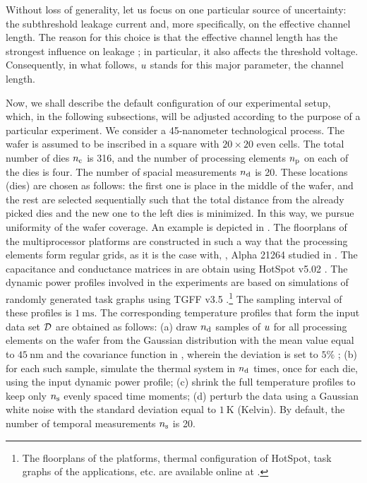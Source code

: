 Without loss of generality, let us focus on one particular source of uncertainty: the subthreshold leakage current and, more specifically, on the effective channel length. The reason for this choice is that the effective channel length has the strongest influence on leakage \cite{juan2011, juan2012}; in particular, it also affects the threshold voltage. Consequently, in what follows, $u$ stands for this major parameter, the channel length.



Now, we shall describe the default configuration of our experimental setup, which, in the following subsections, will be adjusted according to the purpose of a particular experiment. We consider a 45-nanometer technological process. The wafer is assumed to be inscribed in a square with $20 \times 20$ even cells. The total number of dies ${n_{\text{c}}}$ is 316, and the number of processing elements ${n_\text{p}}$ on each of the dies is four. The number of spacial measurements ${n_{\text{d}}}$ is 20. These locations (dies) are chosen as follows: the first one is place in the middle of the wafer, and the rest are selected sequentially such that the total distance from the already picked dies and the new one to the left dies is minimized. In this way, we pursue uniformity of the wafer coverage. An example is depicted in . The floorplans of the multiprocessor platforms are constructed in such a way that the processing elements form regular grids, as it is the case with, \eg, Alpha 21264 studied in \cite{juan2011}. The capacitance and conductance matrices in  are obtain using HotSpot v5.02 \cite{hotspot}. The dynamic power profiles involved in the experiments are based on simulations of randomly generated task graphs using TGFF v3.5 \cite{dick1998}.\footnote{The floorplans of the platforms, thermal configuration of HotSpot, task graphs of the applications, etc. are available online at \cite{sources}.} The sampling interval of these profiles is $1~\text{ms}$. The corresponding temperature profiles that form the input data set $\mathcal{D}$ are obtained as follows: (a) draw ${n_{\text{d}}}$ samples of $u$ for all processing elements on the wafer from the Gaussian distribution with the mean value equal to $45~\text{nm}$ and the covariance function in , wherein the deviation is set to $5\%$ \cite{juan2011, juan2012}; (b) for each such sample, simulate the thermal system in  ${n_{\text{d}}}$ times, once for each die, using the input dynamic power profile; (c) shrink the full temperature profiles to keep only ${n_\text{s}}$ evenly spaced time moments; (d) perturb the data using a Gaussian white noise with the standard deviation equal to $1~\text{K}$ (Kelvin). By default, the number of temporal measurements ${n_\text{s}}$ is 20.

